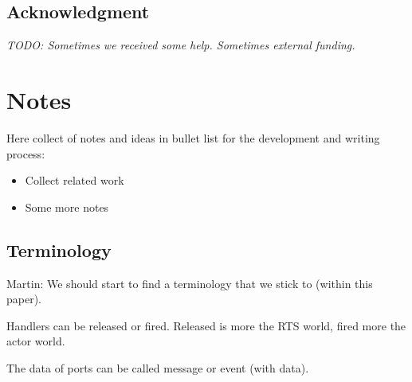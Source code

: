 \documentclass[a4paper, conference]{IEEEtran}
\newcommand{\todo}[1]{{\emph{TODO: #1}}}
\newcommand{\martin}[1]{{\color{blue} Martin: #1}}
\begin{document}
\subsection*{Acknowledgment}

\todo{Sometimes we received some help. Sometimes external funding.}







\section{Notes}

Here collect of notes and ideas in bullet list for the development and writing process:

\begin{itemize}
\item Collect related work
\item Some more notes
\end{itemize}

\subsection{Terminology}

\martin{We should start to find a terminology that we stick to (within this paper).}

Handlers can be released or fired. Released is more the RTS world, fired more the
actor world.

The data of ports can be called message or event (with data).
\end{document}
